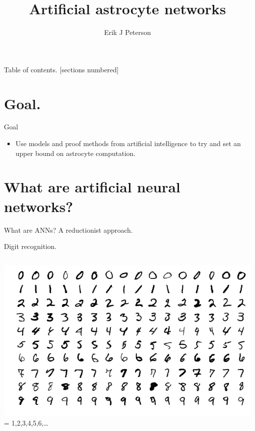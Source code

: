 \documentclass[10pt]{beamer}
\title{Artificial astrocyte networks}
\date{}
\author{Erik J Peterson}
\institute{CoAxLab\\Carnegie Mellon University}
\begin{document}
\maketitle

\begin{frame}{Table of contents.}
  [sections numbered]
  \tableofcontents%
\end{frame}

\section[]{Goal.}
\begin{frame}[fragile]{Goal}
\begin{itemize}
    \item Use models and proof methods from artificial intelligence to try and set an \alert{upper bound} on astrocyte computation.
\end{itemize}
\end{frame}

\section[ANNs]{What are artificial neural networks?}
\begin{frame}[fragile]{What are ANNs?}
A reductionist approach.
\end{frame}

\begin{frame}[fragile]{Digit recognition.}
\begin{columns}
\centering
\includegraphics[scale=0.25]{images/minst.png}
\centering
 = 1,2,3,4,5,6,\ldots
\end{columns}
\end{frame}
\end{document}
